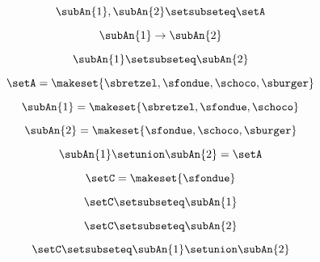 \begin{forslides}
    \begin{equation}
        \label{eq:feedback-068}
        \subAn{1}, \subAn{2} \setsubseteq \setA
    \end{equation}

    \begin{equation}
        \label{eq:feedback-069}
        \subAn{1} \to \subAn{2}
    \end{equation}

    \begin{equation}
        \label{eq:feedback-070}
        \subAn{1} \setsubseteq \subAn{2}
    \end{equation}

    \begin{equation}
        \label{eq:feedback-071}
        \setA = \makeset{ \sbretzel, \sfondue, \schoco, \sburger }
    \end{equation}

    \begin{equation}
        \label{eq:feedback-071b}
        \subAn{1} = \makeset{ \sbretzel, \sfondue, \schoco }
    \end{equation}

    \begin{equation}
        \label{eq:feedback-072}
        \subAn{2} = \makeset{\sfondue, \schoco, \sburger }
    \end{equation}

    \begin{equation}
        \label{eq:feedback-073}
        \subAn{1} \setunion \subAn{2} = \setA
    \end{equation}

    \begin{equation}
        \label{eq:feedback-074}
        \setC = \makeset{ \sfondue }
    \end{equation}

    \begin{equation}
        \label{eq:feedback-075}
        \setC \setsubseteq \subAn{1}
    \end{equation}

    \begin{equation}
        \label{eq:feedback-076}
        \setC \setsubseteq \subAn{2}
    \end{equation}

    \begin{equation}
        \label{eq:feedback-077}
        \setC \setsubseteq \subAn{1} \setunion \subAn{2}
    \end{equation}


\end{forslides}
